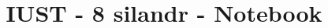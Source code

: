 \documentclass[10pt]{article}
\title{\vspace{-4ex}\Large{IUST - 8 silandr - Notebook}}
\author{}
\date{}
\begin{document}
\begin{landscape}
\begin{multicols}{2}

\maketitle
\vspace{-13ex}
{
\baselineskip
\tableofcontents
}
\pagestyle{fancy}



\end{multicols}
\end{landscape}
\end{document}
